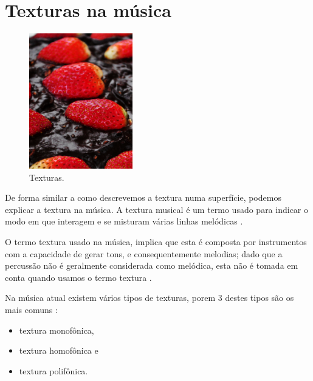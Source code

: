 \section{Texturas na música}
\label{sec:texturasmusica}
\begin{figure}
    \centering 
    \includegraphics[width=0.40\textwidth]{chapters/cap-musicalidade-percepcion/textura.jpg}
  \caption{Texturas.}
\end{figure}
De forma similar a como descrevemos a textura numa superfície,
podemos explicar a textura na música.
A textura musical é um termo usado para indicar o modo em que interagem e 
se misturam várias linhas melódicas \cite[pp. 29]{kerman2015listen}.


O termo textura usado na música, 
implica que esta é composta por instrumentos com a capacidade de gerar tons,
e consequentemente melodias;
dado que a percussão não é geralmente considerada como melódica, 
esta não é tomada em conta quando usamos o termo textura \cite[pp. 59]{holland2013music}.

Na música atual existem  vários tipos de texturas, 
porem 3 destes tipos  são os mais comuns 
\cite[pp. 77]{copland1974ouvir} \cite[pp. 29]{kerman2015listen} \cite[pp. 322]{harnum2009basic}:
\begin{itemize}
\item textura monofônica, 
\item textura homofônica e
\item textura polifônica.
\end{itemize}

 
